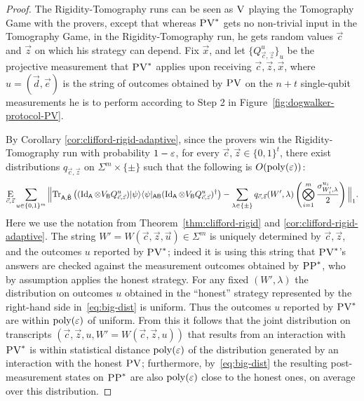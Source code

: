 \begin{proof}
The Rigidity-Tomography runs can be seen as $\textsc{V}$ playing the Tomography Game
  with the provers, except that whereas $\textsc{PV}^*$ gets no non-trivial input in the
  Tomography Game, in the Rigidity-Tomography run, he gets random values
  $\vec{c}$ and $\vec{z}$ on which his strategy can depend. Fix $\vec{x}$, and let
  $\{Q_{\vec{c},\vec{z}}^{u}\}_{u}$ be the projective measurement that $\textsc{PV}^*$
  applies upon receiving $\vec{c},\vec{z},\vec{x}$, where  $u = (\vec{d},\vec{e})$ is
  the string of outcomes obtained by $\textsc{PV}$ on the $n+t$ single-qubit
  measurements he is to perform according to Step 2 in
  Figure~\ref{fig:dogwalker-protocol-PV}. 

By Corollary \ref{cor:clifford-rigid-adaptive}, since the provers win the Rigidity-Tomography run with probability $1-\varepsilon$, for every $\vec{c},\vec{z}\in\{0,1\}^t$,
there exist distributions $q_{\vec{c},\vec{z}}$ on $\Sigma^m\times\{\pm\}$ such that the following is $O(\mathrm{poly}(\varepsilon))$:
\begin{equation}\label{eq:big-dist}
\mathop{\textsc{E}}_{\vec{c},\vec{z}}\sum_{ u\in \{0, 1\}^m}
\Big\| \mbox{\rm Tr}_{{\textsf{A}},\hat{{\textsf{B}}}}\left((\mathop{\rm Id}\nolimits_{{\textsf{A}}}\otimes V_{{\textsf{B}}} Q_{\vec{c},\vec{z}}^{u})|\psi\rangle\langle\psi|_{{\textsf{AB}}}(\mathop{\rm Id}\nolimits_{{\textsf{A}}}\otimes V_{{\textsf{B}}} Q_{\vec{c},\vec{z}}^{u})^\dagger\right)
- \sum_{\lambda\in\{\pm\}}q_{\vec{c},\vec{z}}(W',\lambda)\left(\bigotimes_{i=1}^m \frac{\sigma^{u_i}_{W_i',\lambda}}{2}\right)\Big\|_1. 
\end{equation}
Here we use the notation from Theorem~\ref{thm:clifford-rigid} and
  \ref{cor:clifford-rigid-adaptive}. The string
  $W'=W(\vec{c},\vec{z},\vec{u})\in\Sigma^m$ is uniquely determined by
  $\vec{c},\vec{z}$, and the outcomes ${u}$ reported by $\textsc{PV}^*$; indeed it
  is using this string that $\textsc{PV}^*$'s answers are checked against the
  measurement outcomes obtained by $\textsc{PP}^*$, who by assumption applies the
  honest strategy. For any fixed $(W',\lambda)$ the distribution on
  outcomes $u$ obtained in the ``honest'' strategy represented by the right-hand
  side in~\eqref{eq:big-dist} is uniform. Thus the outcomes $u$ reported by
  $\textsc{PV}^*$ are within $\operatorname{poly}(\varepsilon)$ of uniform. From this it follows that the joint distribution on transcripts $(\vec{c},\vec{z},u,W'=W(\vec{c},\vec{z},u))$ that results from an interaction with $\textsc{PV}^*$ is within statistical distance $\operatorname{poly}(\varepsilon)$ of the distribution generated by an interaction with the honest $\textsc{PV}$; furthermore, by~\eqref{eq:big-dist} the resulting post-measurement states on $\textsc{PP}^*$ are also $\operatorname{poly}(\varepsilon)$ close to the honest ones, on average over this distribution. 


\end{proof}
